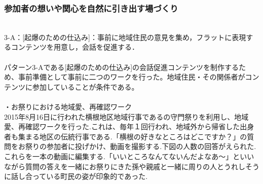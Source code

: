 \documentclass[a4paper]{jsarticle}
\begin{document}
\subsubsection{参加者の想いや関心を自然に引き出す場づくり}\\
3-A：[起爆のための仕込み]：事前に地域住民の意見を集め，フラットに表現するコンテンツを用意し，会話を促進する．\\\\
パターン3-Aである[起爆のための仕込み]の会話促進コンテンツを制作するため、事前準備として事前に二つのワークを行った。地域住民・その関係者がコンテンツに参加していることが条件である。\\\\
・お祭りにおける地域愛、再確認ワーク\\
2015年8月16日に行われた横根地区地域行事であるの守門祭りを利用し、地域愛、再確認ワークを行った.これは、毎年１回行われ、地域外から帰省した出身者も集まる地区の伝統行事である.「横根の好きなところはどこですか？」の質問をお祭りの参加者に投げかけ、動画を撮影する.下図の人数の回答がえられた.これらを一本の動画に編集する.「いいところなんてないんだよなあ〜」といいながら質問の答えを一緒にお祭りにきた孫や親戚と一緒に周りの人とうれしそうに話し合っている町民の姿が印象的であった.
\end{document}
